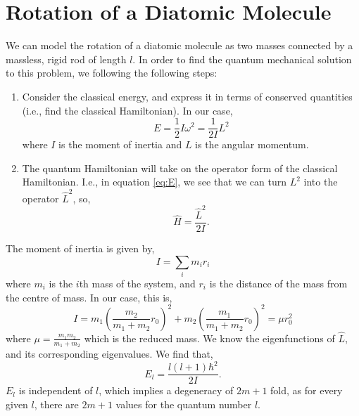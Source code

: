 \documentclass{book}
\begin{document}
\section{Rotation of a Diatomic Molecule}
\begin{figure}
	\centering
	\caption{}
	\label{}
\end{figure}
We can model the rotation of a diatomic molecule as two masses connected by a massless, rigid rod of length $l$. In order to find the quantum mechanical solution to this problem, we following the following steps:
\begin{enumerate}
	\item Consider the classical energy, and express it in terms of conserved quantities (i.e., find the classical Hamiltonian). In our case,
	\begin{equation}
		E = \frac{1}{2}I\omega^2 = \frac{1}{2I}L^2 \label{eq:E}
	\end{equation}
	where $I$ is the moment of inertia and $L$ is the angular momentum.
	\item The quantum Hamiltonian will take on the operator form of the classical Hamiltonian. I.e., in equation \eqref{eq:E}, we see that we can turn $L^2$ into the operator $\hat{L}^2$, so,
	\begin{equation}
		\hat{H} = \frac{\hat{L}^2}{2I}.
	\end{equation}
\end{enumerate}
The moment of inertia is given by,
\begin{equation}
	I = \sum_i m_ir_i
\end{equation}
where $m_i$ is the $i$th mass of the system, and $r_i$ is the distance of the mass from the centre of mass. In our case, this is,
\begin{equation}
	I = m_1\left(\frac{m_2}{m_1 + m_2}r_0\right)^2 + m_2\left(\frac{m_1}{m_1 + m_2}r_0\right)^2 = \mu r_0^2
\end{equation}
where $\mu = \frac{m_1m_2}{m_1 + m_2}$ which is the reduced mass. We know the eigenfunctions of $\hat{L}$, and its corresponding eigenvalues. We find that,
\begin{equation}
	E_l = \frac{l(l+1)\hbar^2}{2I}.
\end{equation}
$E_l$ is independent of $l$, which implies a degeneracy of $2m+1$ fold, as for every given $l$, there are $2m+1$ values for the quantum number $l$.
\end{document}
